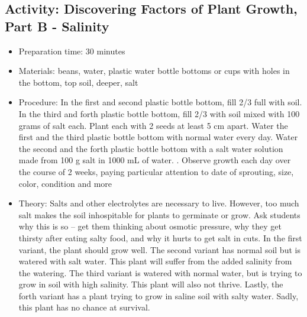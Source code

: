 \subsection{Activity: Discovering Factors of Plant Growth, Part B - Salinity}
\begin{itemize}
\item{Preparation time: 30 minutes}
\item{Materials: beans, water, plastic water bottle bottoms or cups with holes in the bottom, top soil, deeper, salt}
\item{Procedure: In the first and second plastic bottle bottom, fill 2/3 full with soil. In the third and forth plastic bottle bottom, fill 2/3 with soil mixed with 100 grams of salt each. Plant each with 2 seeds at least 5 cm apart. Water the first and the third plastic bottle bottom with normal water every day. Water the second and the forth plastic bottle bottom with a salt water solution made from 100 g salt in 1000 mL of water. . Observe growth each day over the course of 2 weeks, paying particular attention to date of sprouting, size, color, condition and more}
\item{Theory: Salts and other electrolytes are necessary to live. However, too much salt makes the soil inhospitable for plants to germinate or grow. Ask students why this is so – get them thinking about osmotic pressure, why they get thirsty after eating salty food, and why it hurts to get salt in cuts. In the first variant, the plant should grow well. The second variant has normal soil but is watered with salt water. This plant will suffer from the added salinity from the watering. The third variant is watered with normal water, but is trying to grow in soil with high salinity. This plant will also not thrive. Lastly, the forth variant has a plant trying to grow in saline soil with salty water. Sadly, this plant has no chance at survival.}
\end{itemize}

